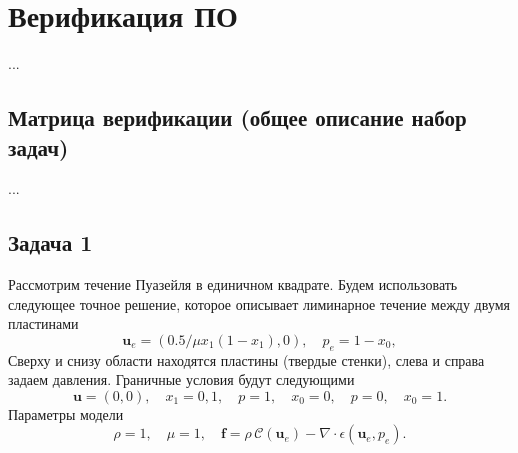 \documentclass[a4paper,10pt]{report}
\begin{document}
\pagebreak
\section{Верификация ПО}
...

\subsection{Матрица верификации (общее описание набор задач)}
...

\subsection{Задача 1}
Рассмотрим течение Пуазейля в единичном квадрате. 
Будем использовать следующее точное решение, которое описывает лиминарное течение между двумя пластинами
\[
    \bm{u}_e = \left(0.5/\mu x_1 (1-x_1), 0 \right), \quad
    p_e = 1-x_0,
\]
Сверху и снизу области находятся пластины (твердые стенки), слева и справа задаем давления. Граничные условия будут следующими
\[
    \bm{u} = (0, 0), \quad x_1 = 0, 1, \quad 
    p = 1, \quad x_0 = 0, \quad 
    p = 0, \quad x_0 = 1.
\]
Параметры модели 
\[
    \rho=1, \quad \mu = 1, \quad \bm{f}= \rho \,\mathcal{C}(\bm{u}_e) - \nabla \cdot \epsilon(\bm{u}_e, p_e).
\]
\end{document}
